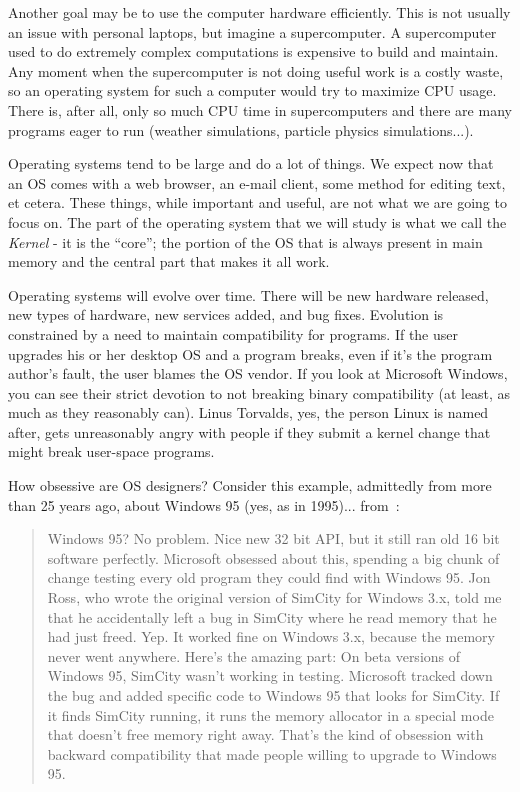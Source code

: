 Another goal may be to use the computer hardware efficiently. This is not usually an issue with personal laptops, but imagine a supercomputer. A supercomputer used to do extremely complex computations is expensive to build and maintain. Any moment when the supercomputer is not doing useful work is a costly waste, so an operating system for such a computer would try to maximize CPU usage. There is, after all, only so much CPU time in supercomputers and there are many programs eager to run (weather simulations, particle physics simulations...).

Operating systems tend to be large and do a lot of things. We expect now that an OS comes with a web browser, an e-mail client, some method for editing text, et cetera. These things, while important and useful, are not what we are going to focus on. The part of the operating system that we will study is what we call the \textit{Kernel} - it is the ``core''; the portion of the OS that is always present in main memory and the central part that makes it all work.

Operating systems will evolve over time. There will be new hardware released, new types of hardware, new services added, and bug fixes. Evolution is constrained by a need to maintain compatibility for programs. If the user upgrades his or her desktop OS and a program breaks, even if it's the program author's fault, the user blames the OS vendor. If you look at Microsoft Windows, you can see their strict devotion to not breaking binary compatibility (at least, as much as they reasonably can). Linus Torvalds, yes, the person Linux is named after, gets unreasonably angry with people if they submit a kernel change that might break user-space programs. 

How obsessive are OS designers? Consider this example, admittedly from more than 25 years ago, about Windows 95 (yes, as in 1995)... from~\cite{joelce}:

\begin{quote}
Windows 95? No problem. Nice new 32 bit API, but it still ran old 16 bit software perfectly. Microsoft obsessed about this, spending a big chunk of change testing every old program they could find with Windows 95. Jon Ross, who wrote the original version of SimCity for Windows 3.x, told me that he accidentally left a bug in SimCity where he read memory that he had just freed. Yep. It worked fine on Windows 3.x, because the memory never went anywhere. Here's the amazing part: On beta versions of Windows 95, SimCity wasn't working in testing. Microsoft tracked down the bug and added specific code to Windows 95 that looks for SimCity. If it finds SimCity running, it runs the memory allocator in a special mode that doesn't free memory right away. That's the kind of obsession with backward compatibility that made people willing to upgrade to Windows 95.
\end{quote}

